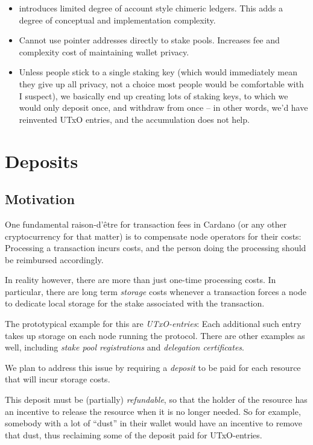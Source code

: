 \documentclass[11pt,a4paper]{article}
\begin{document}
\begin{itemize}
\item
  introduces limited degree of account style chimeric ledgers. This adds
  a degree of conceptual and implementation complexity.
\item
  Cannot use pointer addresses directly to stake pools. Increases fee
  and complexity cost of maintaining wallet privacy.
\item
  Unless people stick to a single staking key (which would immediately
  mean they give up all privacy, not a choice most people would be
  comfortable with I suspect), we basically end up creating lots of
  staking keys, to which we would only deposit once, and withdraw from
  once -- in other words, we'd have reinvented UTxO entries, and the
  accumulation does not help.
\end{itemize}

\section{Deposits}
\label{deposits}

\subsection{Motivation}

One fundamental raison-d'\^{e}tre for transaction fees in Cardano (or any other
cryptocurrency for that matter) is to compensate node operators for their costs:
Processing a transaction incurs costs, and the person doing the processing
should be reimbursed accordingly.

In reality however, there are more than just one-time processing costs.
In particular, there are long term \emph{storage} costs whenever a transaction
forces a node to dedicate local storage for the stake associated with the
transaction.

The prototypical example for this are \emph{UTxO-entries}: Each additional such entry
takes up storage on each node running the protocol.
There are other examples as well, including \emph{stake pool registrations} and
\emph{delegation certificates}.

We plan to address this issue by requiring a \emph{deposit} to be paid for each
resource that will incur storage costs.

This deposit must be (partially) \emph{refundable},
so that the holder of the resource has an incentive to release the resource when
it is no longer needed. So for example, somebody with a lot of ``dust'' in their
wallet would have an incentive to remove that dust, thus reclaiming some of the
deposit paid for UTxO-entries.
\end{document}
